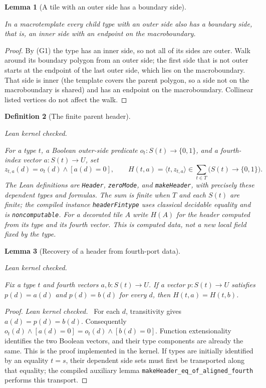 \documentclass[11pt,a4paper]{article}
\newtheorem{definition}{Definition}[section]
\newtheorem{lemma}[definition]{Lemma}
\theoremstyle{remark}
\newcommand{\lean}[1]{}
\newcommand{\uses}[1]{}
\newcommand{\leanok}{\textit{Lean kernel checked.}\ }
\begin{document}
\begin{lemma}[A tile with an outer side has a boundary side]
\label{lem:comp/outer-boundary}
\lean{Tilings.Planned.boundary_side_of_outer_side,Tilings.Planned.Strict.exists_boundary_side_of_outer}
\uses{def:certificate}
In a macrotemplate every child type with an outer side also has a boundary
side, that is, an inner side with an endpoint on the macroboundary.
\end{lemma}
\begin{proof}
By (G1) the type has an inner side, so not all of its sides are outer.
Walk around its boundary polygon from an outer side; the first side that
is not outer starts at the endpoint of the last outer side, which lies on
the macroboundary. That side is inner (the template covers the parent
polygon, so a side not on the macroboundary is shared) and has an endpoint
on the macroboundary. Collinear listed vertices do not affect the walk.
\end{proof}

\begin{definition}[The finite parent header]
\label{def:control/header}
\lean{Tilings.HeaderKernel.makeHeader}
\leanok
\uses{def:control/typed-decoration}
For a type $t$, a Boolean outer-side predicate $o_t:S(t)\to\{0,1\}$,
and a fourth-index vector $a:S(t)\to U$, set
\[
 z_{t,a}(d)=o_t(d)\mathbin{\wedge}[a(d)=0],\qquad
 H(t,a)=\bigl\langle t,z_{t,a}\bigr\rangle
 \in\sum_{t\in T}\bigl(S(t)\to\{0,1\}\bigr).
\]
The Lean definitions are \texttt{Header}, \texttt{zeroMode}, and
\texttt{makeHeader}, with precisely these dependent types and formulas.
The sum is finite when $T$ and each $S(t)$ are finite; the compiled instance
\texttt{headerFintype} uses classical decidable equality and is
\texttt{noncomputable}. For a decorated tile $A$ write $H(A)$ for the header
computed from its type and its fourth vector. This is computed data, not a
new local field fixed by the type.
\end{definition}

\begin{lemma}[Recovery of a header from fourth-port data]
\label{lem:comp/port-recovery}
\lean{Tilings.HeaderKernel.makeHeader_eq_of_port_recovery}
\leanok
\uses{def:control/header}
Fix a type $t$ and fourth vectors $a,b:S(t)\to U$. If a vector
$p:S(t)\to U$ satisfies $p(d)=a(d)$ and $p(d)=b(d)$ for every $d$, then
$H(t,a)=H(t,b)$.
\end{lemma}
\begin{proof}
 \leanok
For each $d$, transitivity gives $a(d)=p(d)=b(d)$. Consequently
$o_t(d)\wedge[a(d)=0]=o_t(d)\wedge[b(d)=0]$. Function extensionality
identifies the two Boolean vectors, and their type components are already
the same. This is the proof implemented in the kernel. If types are initially
identified by an equality $t=s$, their dependent side sets must first be
transported along that equality; the compiled auxiliary lemma
\texttt{makeHeader\_eq\_of\_aligned\_fourth} performs this transport.
\end{proof}
\end{document}

